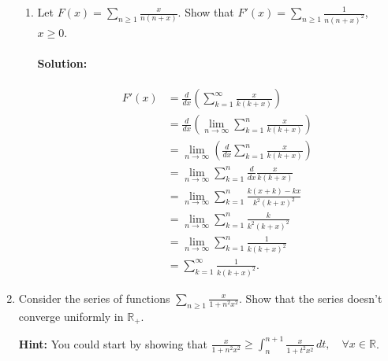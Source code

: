 \documentclass{article}
\begin{document}
\begin{enumerate}
\begin{enumerate}
    \item Let $F(x)=\sum_{n\geq 1}^{} \frac{x}{n(n+x)}$. Show that $F'(x)=\sum_{n\geq 1}^{} \frac{1}{n(n+x)^2}$, $x\geq 0$.
        \paragraph{Solution: }
        \begin{align*}
            F'(x)&= \frac{d}{dx}\left(  \sum_{k=1}^{\infty} \frac{x}{k(k+x)}\right)  \\
                &= \frac{d}{dx}\left( \lim_{n \to \infty} \sum_{k=1}^{n} \frac{x}{k(k+x)}\right)  \\
                &= \lim_{n \to \infty}\left( \frac{d}{dx}\sum_{k=1}^{n} \frac{x}{k(k+x)}  \right)\\
                &= \lim_{n \to \infty} \sum_{k=1}^{n} \frac{d}{dx}\frac{x}{k(k+x)}  \\
                &= \lim_{n \to \infty} \sum_{k=1}^{n} \frac{k(x+k)-kx}{k^2(k+x)^2}  \\
                &= \lim_{n \to \infty} \sum_{k=1}^{n} \frac{k}{k^2(k+x)^2}  \\
                &= \lim_{n \to \infty} \sum_{k=1}^{n} \frac{1}{k(k+x)^2}  \\
                &= \sum_{k=1}^{\infty} \frac{1}{k(k+x)^2} 
        .\end{align*}

  \end{enumerate}
  \newpage
\item Consider the series of functions $\sum_{n\geq 1}^{} \frac{x}{1+n^2x^2}$. Show that the series doesn't converge uniformly in $\mathbb{R}_+$.

  \textbf{Hint:} You could start by showing that $\frac{x}{1+n^2x^2}\geq \int_{n}^{n+1} \frac{x}{1+t^2x^2} \, d t, \quad \forall x\in \mathbb{R}$.

\end{enumerate}
\end{document}
